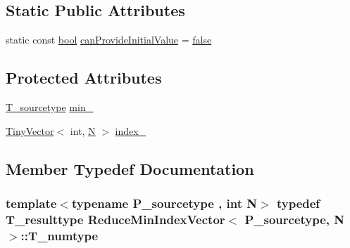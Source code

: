 \subsection*{Static Public Attributes}
\begin{DoxyCompactItemize}
\item 
static const \hyperlink{compiler_8h_abb452686968e48b67397da5f97445f5b}{bool} \hyperlink{classReduceMinIndexVector_aeb5e62adebe7de16689be999677a44ca}{can\+Provide\+Initial\+Value} = \hyperlink{compiler_8h_a65e9886d74aaee76545e83dd09011727}{false}
\end{DoxyCompactItemize}
\subsection*{Protected Attributes}
\begin{DoxyCompactItemize}
\item 
\hyperlink{classReduceMinIndexVector_a65030b49259be23f83d7a2714e93f502}{T\+\_\+sourcetype} \hyperlink{classReduceMinIndexVector_a4af67907330e5b438af07b9c5d39ecf1}{min\+\_\+}
\item 
\hyperlink{classTinyVector}{Tiny\+Vector}$<$ int, \hyperlink{polmisc_8c_a0240ac851181b84ac374872dc5434ee4}{N} $>$ \hyperlink{classReduceMinIndexVector_a33054f6c7de30b79eaae6cf37e1e689e}{index\+\_\+}
\end{DoxyCompactItemize}


\subsection{Member Typedef Documentation}
\hypertarget{classReduceMinIndexVector_af174899864203ff165812b420d848125}{}
\subsubsection[{T\+\_\+numtype}]{\setlength{\rightskip}{0pt plus 5cm}template$<$typename P\+\_\+sourcetype , int N$>$ typedef {\bf T\+\_\+resulttype} {\bf Reduce\+Min\+Index\+Vector}$<$ P\+\_\+sourcetype, {\bf N} $>$\+::{\bf T\+\_\+numtype}}\label{classReduceMinIndexVector_af174899864203ff165812b420d848125}
\hypertarget{classReduceMinIndexVector_a2e7c894a95020e5638affc6f1c8a4e50}{}
